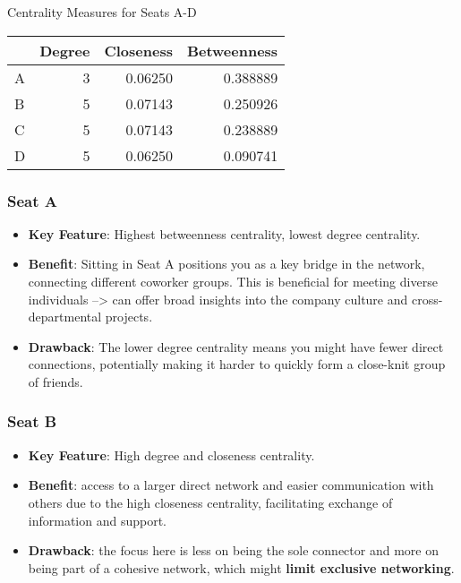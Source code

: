 \documentclass[
]{article}
\providecommand{\tightlist}{%
  \setlength{\itemsep}{0pt}\setlength{\parskip}{0pt}}
\begin{document}
Centrality Measures for Seats A-D

\begin{longtable}[]{@{}lrrr@{}}
\toprule()
& Degree & Closeness & Betweenness \\
\midrule()
\endhead
A & 3 & 0.06250 & 0.388889 \\
B & 5 & 0.07143 & 0.250926 \\
C & 5 & 0.07143 & 0.238889 \\
D & 5 & 0.06250 & 0.090741 \\
\bottomrule()
\end{longtable}

\hypertarget{seat-a}{%
\subsubsection{Seat A}\label{seat-a}}

\begin{itemize}
\tightlist
\item
  \textbf{Key Feature}: Highest betweenness centrality, lowest degree
  centrality.
\item
  \textbf{Benefit}: Sitting in Seat A positions you as a key bridge in
  the network, connecting different coworker groups. This is beneficial
  for meeting diverse individuals --\textgreater{} can offer broad
  insights into the company culture and cross-departmental projects.
\item
  \textbf{Drawback}: The lower degree centrality means you might have
  fewer direct connections, potentially making it harder to quickly form
  a close-knit group of friends.
\end{itemize}

\hypertarget{seat-b}{%
\subsubsection{Seat B}\label{seat-b}}

\begin{itemize}
\tightlist
\item
  \textbf{Key Feature}: High degree and closeness centrality.
\item
  \textbf{Benefit}: access to a larger direct network and easier
  communication with others due to the high closeness centrality,
  facilitating exchange of information and support.
\item
  \textbf{Drawback}: the focus here is less on being the sole connector
  and more on being part of a cohesive network, which might
  \textbf{limit exclusive networking}.
\end{itemize}
\end{document}
